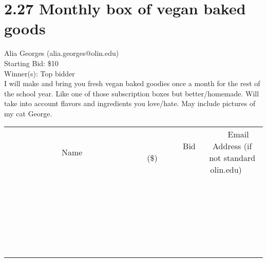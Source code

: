 \documentclass[11pt]{article}
\begin{document}
\section*{2.27 Monthly box of vegan baked goods}
Alia Georges (alia.georges@olin.edu) \\
Starting Bid: \$10 \\
Winner(s): 
Top bidder \\
I will make and bring you fresh vegan baked goodies once a month for the rest of the school year. Like one of those subscription boxes but better/homemade. Will take into account flavors and ingredients you love/hate. May include pictures of my cat George. \\[6ex]
\begin{tabular}{c c c}
~~~~~~~~~~~~~Name~~~~~~~~~~~~~ & ~~~~~~~~~Bid (\$)~~~~~~~~~ & ~~~Email Address (if not standard olin.edu)~~~ \\
 & & \\
\hline
 & & \\
\hline
 & & \\
\hline
 & & \\
\hline
 & & \\
\hline
 & & \\
\hline
 & & \\
\hline
 & & \\
\hline
 & & \\
\hline
 & & \\
\hline
 & & \\
\hline
 & & \\
\hline
 & & \\
\hline
 & & \\
\hline
 & & \\
\hline
 & & \\
\hline
 & & \\
\hline
 & & \\
\hline
 & & \\
\hline
 & & \\
\hline
 & & \\
\hline
 & & \\
\hline
 & & \\
\hline
 & & \\
\hline
 & & \\
\hline
 & & \\
\hline
\end{tabular}
\clearpage
\end{document}
